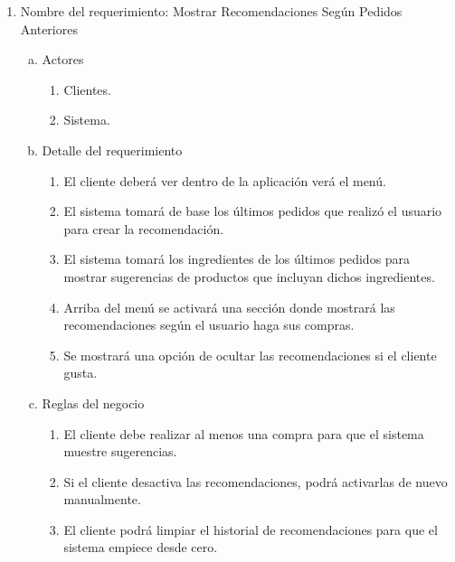 \documentclass[conference]{IEEEtran}
\begin{document}
\begin{enumerate}
\item Nombre del requerimiento: Mostrar Recomendaciones Según Pedidos Anteriores 
\begin{enumerate}[a)]
\item Actores
	\begin{enumerate}[a]
	\item Clientes.
	\item Sistema. 
	\end{enumerate}
\item Detalle del requerimiento
	\begin{enumerate}[P{a}so 1.]
	\item El cliente deberá ver dentro de la aplicación verá el menú. 
	\item El sistema tomará de base los últimos pedidos que realizó el usuario para crear la recomendación. 
	\item El sistema tomará los ingredientes de los últimos pedidos para mostrar sugerencias de productos que incluyan dichos ingredientes. 
	\item Arriba del menú se activará una sección donde mostrará las recomendaciones según el usuario haga sus compras. 
	\item Se mostrará una opción de ocultar las recomendaciones si el cliente gusta. 
	\end{enumerate}
\item Reglas del negocio
	\begin{enumerate}[a]
	\item El cliente debe realizar al menos una compra para que el sistema muestre sugerencias. 
	\item Si el cliente desactiva las recomendaciones, podrá activarlas de nuevo manualmente. 
	\item El cliente podrá limpiar el historial de recomendaciones para que el sistema empiece desde cero. 
	\end{enumerate}
\end{enumerate}


\end{enumerate}
\end{document}
